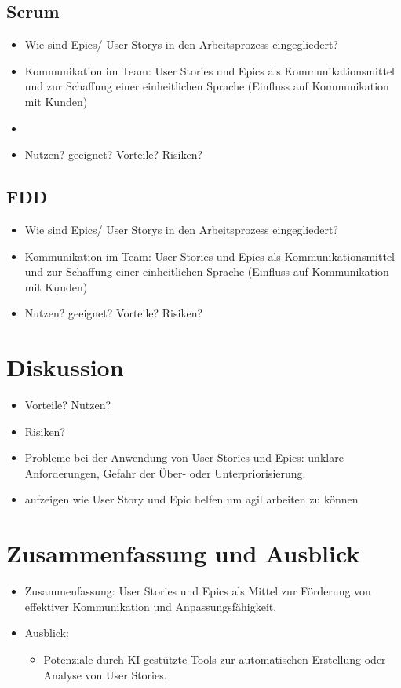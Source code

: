 \documentclass[acmtog]{acmart}
\begin{document}
\subsection{Scrum}
	\begin{itemize}
		\item Wie sind Epics/ User Storys in den Arbeitsprozess eingegliedert?
		\item Kommunikation im Team: User Stories und Epics als Kommunikationsmittel und zur Schaffung einer einheitlichen Sprache (Einfluss auf Kommunikation mit Kunden)
		\item \item Nutzen? geeignet? Vorteile? Risiken?
	\end{itemize}

\subsection{FDD}
	\begin{itemize}
		\item Wie sind Epics/ User Storys in den Arbeitsprozess eingegliedert?
		\item Kommunikation im Team: User Stories und Epics als Kommunikationsmittel und zur Schaffung einer einheitlichen Sprache (Einfluss auf Kommunikation mit Kunden)
		\item Nutzen? geeignet? Vorteile? Risiken?
	\end{itemize}



\section{Diskussion}

\begin{itemize}
	\item Vorteile? Nutzen?
	\item Risiken?
	\item Probleme bei der Anwendung von User Stories und Epics: unklare Anforderungen, Gefahr der Über- oder Unterpriorisierung.
	\item aufzeigen wie User Story und Epic helfen um agil arbeiten zu können
\end{itemize}

\section{Zusammenfassung und Ausblick}

\begin{itemize}
	\item Zusammenfassung: User Stories und Epics als Mittel zur Förderung von effektiver Kommunikation und Anpassungsfähigkeit.
	\item Ausblick:
	\begin{itemize}
		\item Potenziale durch KI-gestützte Tools zur automatischen Erstellung oder Analyse von User Stories.
	\end{itemize}
\end{itemize}
\end{document}
